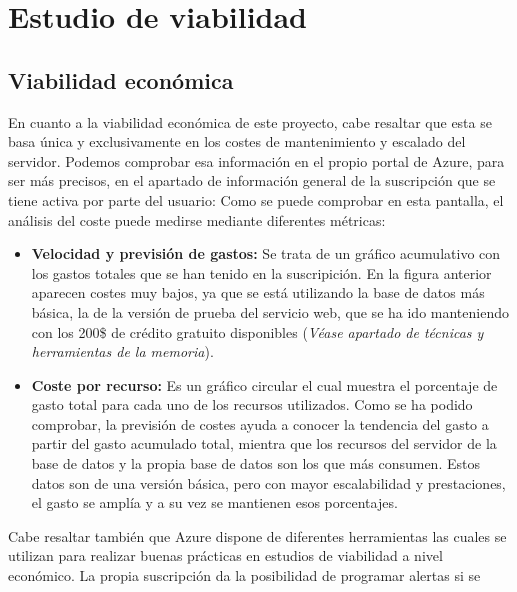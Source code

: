 \section{Estudio de viabilidad}

\subsection{Viabilidad económica}

En cuanto a la viabilidad económica de este proyecto, cabe resaltar que esta se
basa única y exclusivamente en los costes de mantenimiento y escalado del
servidor. Podemos comprobar esa información en el propio portal de Azure, para
ser más precisos, en el apartado de información general de la suscripción que se
tiene activa por parte del usuario:
Como se puede comprobar en esta pantalla, el análisis del coste puede medirse mediante diferentes métricas:
\begin{itemize}
    \item \textbf{Velocidad y previsión de gastos: }Se trata de un gráfico
    acumulativo con los gastos totales que se han tenido en la suscripición. En
    la figura anterior aparecen costes muy bajos, ya que se está utilizando la
    base de datos más básica, la de la versión de prueba del servicio web, que
    se ha ido manteniendo con los 200\$ de crédito gratuito disponibles
    (\textit{Véase apartado de técnicas y herramientas de la memoria}).
    \item \textbf{Coste por recurso: }Es un gráfico circular el cual muestra el
    porcentaje de gasto total para cada uno de los recursos utilizados.
    Como se ha podido comprobar, la previsión de costes ayuda a conocer la
    tendencia del gasto a partir del gasto acumulado total, mientra que los
    recursos del servidor de la base de datos y la propia base de datos son los
    que más consumen. Estos datos son de una versión básica, pero con mayor
    escalabilidad y prestaciones, el gasto se amplía y a su vez se mantienen
    esos porcentajes.
\end{itemize}
Cabe resaltar también que Azure dispone de diferentes herramientas las cuales se
utilizan para realizar buenas prácticas en estudios de viabilidad a nivel
económico. La propia suscripción da la posibilidad de programar alertas si se
